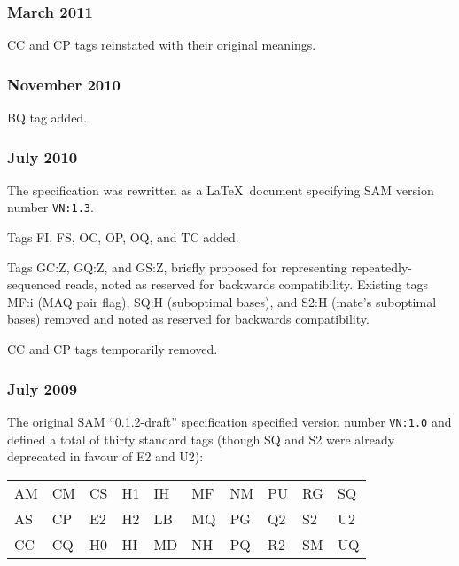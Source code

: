 \documentclass[10pt]{article}
\begin{document}
\begin{appendices}
\subsubsection*{March 2011}

CC and CP tags reinstated with their original meanings.

\subsubsection*{November 2010}

BQ tag added.

\subsubsection*{July 2010}

The specification was rewritten as a \LaTeX\ document specifying SAM version number {\tt VN:1.3}.

\gap
Tags FI, FS, OC, OP, OQ, and TC added.

Tags GC:Z, GQ:Z, and GS:Z, briefly proposed for representing repeatedly-sequenced reads, noted as reserved for backwards compatibility.
Existing tags MF:i (MAQ pair flag), SQ:H (suboptimal bases), and S2:H (mate's suboptimal bases) removed and noted as reserved for backwards compatibility.

CC and CP tags temporarily removed.

\subsubsection*{July 2009}

\begin{samepage}
The original SAM ``0.1.2-draft'' specification specified version number {\tt VN:1.0} and defined a total of thirty standard tags (though SQ and S2 were already deprecated in favour of E2 and U2):

\begin{center}
\begin{tabular}{l*{9}{@{\qquad}l}}
AM & CM & CS & H1 & IH & MF & NM & PU & RG & SQ \\
AS & CP & E2 & H2 & LB & MQ & PG & Q2 & S2 & U2 \\
CC & CQ & H0 & HI & MD & NH & PQ & R2 & SM & UQ
\end{tabular}
\end{center}
\end{samepage}

\end{appendices}
\end{document}
